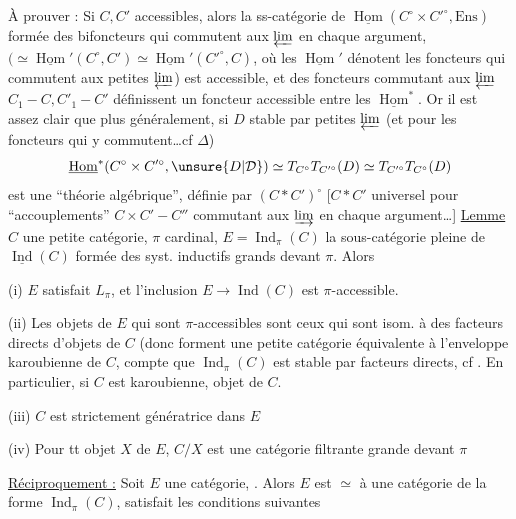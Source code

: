 À prouver : Si $C,C'$ accessibles, alors la ss-catégorie de $\underline{\operatorname{Hom}}(C^\circ\times C'^\circ,\mathrm{Ens})$  formée des bifoncteurs qui commutent aux $\varprojlim$  en chaque argument, $(\simeq\underline{\operatorname{Hom}}'(C^\circ,C')\simeq\underline{\operatorname{Hom}}'(C'^\circ,C)$, où les $\underline{\operatorname{Hom}}'$ dénotent les foncteurs qui commutent aux petites $\varprojlim$) est accessible, et des foncteurs commutant aux $\varprojlim$ $C_1\mathbin{-}C,C'_1\mathbin{-}C'$ définissent un foncteur accessible entre les $\underline{\operatorname{Hom}}^*$. Or il est assez clair que plus généralement, si $D$  stable par petites $\varprojlim$ (et pour les foncteurs qui y commutent\ldots cf  $\Delta$)
\[
 \underline{\operatorname{Hom}}^*(C^\circ\times C'^\circ,\unsure{D|\mathcal D})\simeq T_{C^\circ}T_{C'^\circ}(D)\simeq T_{C'^\circ}T_{C^\circ}(D)
\]
est une ``théorie algébrique'', définie par $(C*C')^\circ$ [$C*C'$ universel pour ``accouplements'' $C\times C'\mathbin{-}C''$ commutant aux $\varinjlim$ en chaque argument\ldots]
\uline{Lemme} $C$ une petite catégorie, $\pi$  cardinal, $E=\operatorname{Ind}_{\pi}(C)$ la sous-catégorie pleine de $\underline{\operatorname{Ind}}(C)$ formée des syst. inductifs  grands devant $\pi$. Alors

(i) $E$  satisfait $L_\pi$, et l'inclusion $E\to\operatorname{Ind}(C)$  est $\pi$-accessible.

(ii) Les objets de $E$ qui sont $\pi$-accessibles sont ceux qui sont isom. à des facteurs directs d'objets de $C$ (donc forment une petite catégorie équivalente à l'enveloppe karoubienne de $C$, compte  que $\operatorname{Ind}_\pi(C)$ est stable par facteurs directs, cf \unsure{(i)$'$]|(i)]|(i))}. En particulier, si $C$ est karoubienne,   objet de $C$.

(iii) $C$ est strictement génératrice dans $E$

(iv) Pour tt objet $X$ de $E$, $C/X$ est une  catégorie filtrante grande devant $\pi$

\uline{Réciproquement :} Soit $E$ une catégorie, . Alors $E$ est $\simeq$ à une catégorie de la forme $\operatorname{Ind}_\pi(C)$,   satisfait les conditions suivantes

